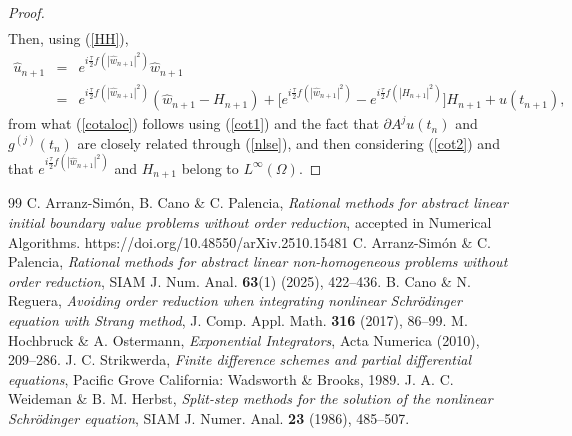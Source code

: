 \documentclass[10pt,a4paper]{amsart}
\begin{document}
\begin{proof}
\begin{eqnarray}
\label{cot2}
\end{eqnarray}
Then, using (\ref{HH}),
\begin{eqnarray}
\hat{u}_{n+1}&=&e^{i \frac{\tau}{2} f(|\hat{w}_{n+1}|^2)} \hat{w}_{n+1}
\nonumber \\
&=& e^{i \frac{\tau}{2} f(|\hat{w}_{n+1}|^2)}(\hat{w}_{n+1}-H_{n+1})+\big[e^{i \frac{\tau}{2}f(|\hat{w}_{n+1}|^2)}-e^{i \frac{\tau}{2}f(|H_{n+1}|^2)} \big]H_{n+1}+u(t_{n+1}),  \nonumber
\end{eqnarray}
from what (\ref{cotaloc}) follows using (\ref{cot1}) and the fact that $\partial A^j u(t_n)$ and $g^{(j)}(t_n)$ are closely related through (\ref{nlse}), and then considering (\ref{cot2}) and that $e^{i \frac{\tau}{2}f(|\hat{w}_{n+1}|^2)}$ and $H_{n+1}$ belong to $L^\infty(\Omega)$.
\end{proof}


\begin{thebibliography}{99}
 C. Arranz-Sim\'on, B. Cano \& C. Palencia, {\it Rational methods for abstract linear initial boundary value problems without order reduction}, accepted in Numerical Algorithms. https://doi.org/10.48550/arXiv.2510.15481
 C. Arranz-Sim\'on \& C. Palencia, {\it Rational methods for abstract linear non-homogeneous problems without order reduction}, SIAM J. Num. Anal. \textbf{63}(1) (2025), 422--436.
 B. Cano \& N. Reguera, {\it Avoiding order reduction when integrating nonlinear Schr\"odinger equation with Strang method}, J. Comp. Appl. Math. \textbf{316} (2017), 86--99.
 M. Hochbruck \& A. Ostermann, {\it Exponential Integrators}, Acta Numerica (2010), 209--286.
 J. C. Strikwerda, {\it Finite difference schemes and partial differential equations}, Pacific Grove California: Wadsworth \& Brooks, 1989.
 J. A. C. Weideman \& B. M. Herbst, {\it Split-step methods for the solution of the nonlinear Schr\"odinger equation}, SIAM J. Numer. Anal. \textbf{23} (1986), 485--507.
\end{thebibliography}
\end{document}
